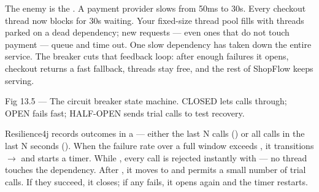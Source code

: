  The enemy is the . A payment provider slows from 50ms to 30s. Every checkout thread now blocks for 30s waiting. Your fixed-size thread pool fills with threads parked on a dead dependency; new requests --- even ones that do not touch payment --- queue and time out. One slow dependency has taken down the entire service. The breaker cuts that feedback loop: after enough failures it opens, checkout returns a fast fallback, threads stay free, and the rest of ShopFlow keeps serving.

\begin{wbfigure}{Fig 13.5 --- The circuit breaker state machine. CLOSED lets calls through; OPEN fails fast; HALF-OPEN sends trial calls to test recovery.}
\end{wbfigure}

 Resilience4j records outcomes in a  --- either the last N calls () or all calls in the last N seconds (). When the failure rate over a full window exceeds , it transitions  $\rightarrow$  and starts a timer. While , every call is rejected instantly with  --- no thread touches the dependency. After , it moves to  and permits a small number of trial calls. If they succeed, it closes; if any fails, it opens again and the timer restarts.

